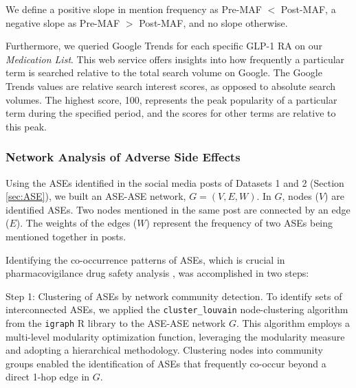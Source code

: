 \documentclass[referee,bst/sn-basic]{sn-jnl}%
\theoremstyle{thmstyletwo}%
\theoremstyle{thmstylethree}%
\begin{document}
We define a positive slope in mention frequency as Pre-MAF $<$ Post-MAF, a negative slope as Pre-MAF $>$ Post-MAF, and no slope otherwise.

Furthermore, we queried Google Trends \cite{woloszko2020tracking} 
for each specific GLP-1 RA on our \textit{Medication List}.
This web service offers insights into how frequently a particular term is searched relative to the total search volume on Google.
The Google Trends values are relative search interest scores, as opposed to absolute search volumes.
The highest score, 100, represents the peak popularity of a particular term during the specified period, and the scores for other terms are relative to this peak.

\subsubsection{Network Analysis of Adverse Side Effects}
\label{sec:net}
Using the ASEs identified in the social media posts of Datasets 1 and 2 (Section \ref{sec:ASE}), we built an ASE-ASE network, $G=(V,E,W)$. 
In $G$, nodes ($V$) are identified ASEs. 
Two nodes mentioned in the same post are connected by an edge ($E$). 
The weights of the edges ($W$) represent the frequency of two ASEs being mentioned together in posts.

Identifying the co-occurrence patterns of ASEs, which is crucial in pharmacovigilance drug safety analysis \cite{galeano2020predicting}, 
was accomplished in two steps:

{Step 1: Clustering of ASEs by network community detection.}
To identify sets of interconnected ASEs, we applied the \texttt{cluster\_louvain} node-clustering algorithm from the \texttt{igraph} R library to the ASE-ASE network $G$. 
This algorithm employs a multi-level modularity optimization function, leveraging the modularity measure and adopting a hierarchical methodology.
Clustering nodes into community groups enabled the identification of ASEs that frequently co-occur beyond a direct 1-hop edge in $G$.
\end{document}
